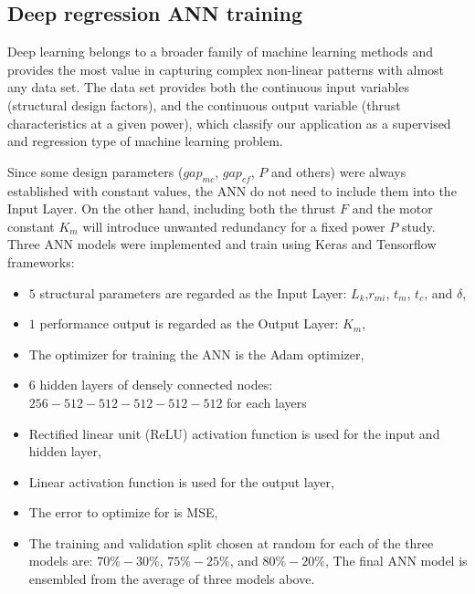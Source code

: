         
        \subsection{Deep regression ANN training}   \label{Chapter:RSM/PMLSM/ANN training}
        
            
            Deep learning belongs to a broader family of machine learning methods and provides the most value in capturing complex non-linear patterns with almost any data set. The data set provides both the continuous input variables (structural design factors), and the continuous output variable (thrust characteristics at a given power), which classify our application as a supervised and regression type of machine learning problem.
            
            
            Since some design parameters ($gap_{mc}$, $gap_{cf}$, $P$ and others) were always established with constant values, the \acs{ANN} do not need to include them into the Input Layer. On the other hand, including both the thrust $F$ and the motor constant $K_m$ will introduce unwanted redundancy for a fixed power $P$ study. Three \acs{ANN} models were implemented and train using Keras and Tensorflow frameworks:
            
            
            \begin{itemize}
                \item $5$ structural parameters are regarded as the Input Layer: $L_k$,$r_{mi}$, $t_m$, $t_c$, and $\delta$,
                \item $1$ performance output is regarded as the Output Layer: $K_m$,
                \item The optimizer for training the \acs{ANN} is the Adam optimizer,
                \item $6$ hidden layers of densely connected nodes: $256-512-512-512-512-512$ for each layers
                \item Rectified linear unit (ReLU) activation function is used
for the input and hidden layer,
                \item Linear activation function is used for the output layer,
                \item The error to optimize for is \acf{MSE},
                \item The training and validation split chosen at random for each of the three models are: $70\%-30\%$, $75\%-25\%$, and $80\%-20\%$,
                The final \acs{ANN} model is ensembled from the average of three models above.
            \end{itemize}
            
